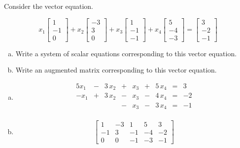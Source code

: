 
\begin{exerciseStatement}


Consider the vector equation.

\[ x_{1} \left[\begin{array}{c}
1 \\
-1 \\
0
\end{array}\right] + x_{2} \left[\begin{array}{c}
-3 \\
3 \\
0
\end{array}\right] + x_{3} \left[\begin{array}{c}
1 \\
-1 \\
-1
\end{array}\right] + x_{4} \left[\begin{array}{c}
5 \\
-4 \\
-3
\end{array}\right] = \left[\begin{array}{c}
3 \\
-2 \\
-1
\end{array}\right] \]
\begin{enumerate}[(a)]
\item  Write a system of scalar equations corresponding to this vector equation. 
\item  Write an augmented matrix corresponding to this vector equation. 
\end{enumerate}
    
\end{exerciseStatement}
    
\begin{exerciseAnswer} 

\begin{enumerate}[(a)]
\item 
\begin{alignat*}{5} x_{1} &-& 3 \, x_{2} &+& x_{3} &+& 5 \, x_{4} &=& 3 \\-x_{1} &+& 3 \, x_{2} &-& x_{3} &-& 4 \, x_{4} &=& -2 \\ & &  &-& x_{3} &-& 3 \, x_{4} &=& -1 \\ \end{alignat*}
            
\item \[ \left[\begin{array}{cccc|c}
1 & -3 & 1 & 5 & 3 \\
-1 & 3 & -1 & -4 & -2 \\
0 & 0 & -1 & -3 & -1
\end{array}\right] \]
\end{enumerate}
    
\end{exerciseAnswer}
    
